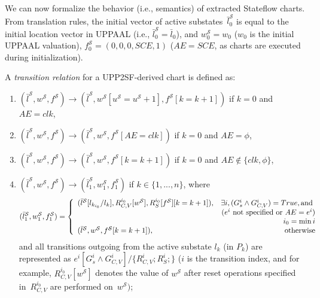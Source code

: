 We can now formalize the behavior (i.e., semantics) of extracted Stateflow charts. From translation rules, the initial vector of active substates~$\bar{l}^\mathcal{S}_0$ is equal to the initial location vector in UPPAAL (i.e., $\bar{l}^\mathcal{S}_0=\bar{l}_0$), and $w^\mathcal{S}_0=w_0$ ($w_0$ is the initial UPPAAL valuation), $f^\mathcal{S}_0=(0,0,0,SCE,1)$ ($AE=SCE$, as charts are executed during initialization). 

\begin{definition}
\label{def:sf_sem}
A \textit{transition relation} for a UPP2SF-derived chart is defined as:

\begin{enumerate}
\item $(\bar{l}^\mathcal{S},w^\mathcal{S},f^\mathcal{S})\rightarrow (\bar{l}^\mathcal{S},w^\mathcal{S}[u^\mathcal{S}=u^\mathcal{S}+1],f^\mathcal{S}[k=k+1])$ if $k=0$ and $AE=clk$,

\item  $(\bar{l}^\mathcal{S},w^\mathcal{S},f^\mathcal{S})\rightarrow (\bar{l}^\mathcal{S},w^\mathcal{S},f^\mathcal{S}[AE=clk])$ if $k=0$ and $AE=\phi$,

\item $(\bar{l}^\mathcal{S},w^\mathcal{S},f^\mathcal{S})\rightarrow (\bar{l}^\mathcal{S},w^\mathcal{S},f^\mathcal{S}[k=k+1])$ if $k=0$ and $AE\notin\{clk,\phi\}$,

\item $(\bar{l}^\mathcal{S},w^\mathcal{S},f^\mathcal{S})\rightarrow (\bar{l}^\mathcal{S}_1,w^\mathcal{S}_1,f^\mathcal{S}_1)$ if $k\in\{1,...,n\}$, where
\begin{equation*}
(\bar{l}^\mathcal{S}_1, w^\mathcal{S}_1,f^\mathcal{S}_1)= \left\{
\begin{array}{lr} 
(\bar{l}^\mathcal{S}[l_{k_{i_0}}/l_k], R_{C,V}^{i_0}[w^\mathcal{S}],R_S^{i_0}[f^\mathcal{S}][k=k+1]), & \exists i, (G_s^i\wedge G_{C,V}^i)=True, \hbox{and }\\
& (e^i\hbox{ not specified or } AE=e^i)\\
& i_0=\min i\\
(\bar{l}^\mathcal{S}, w^\mathcal{S},f^\mathcal{S}[k=k+1]), & \hbox{otherwise}
\end{array}
\right.
\end{equation*}
and all transitions outgoing from the active substate $l_k$ (in $P_k$) are represented as 
$e^i[G_s^i\wedge G_{C,V}^i]/\{R_{C,V}^i; R_S^i;\}$ ($i$ is the transition index, and for example, $R_{C,V}^{i_0}[w^\mathcal{S}]$ denotes the value of $w^\mathcal{S}$ after reset operations specified in~$R_{C,V}^{i_0}$ are performed on~$w^\mathcal{S})$;


\end{enumerate}
\end{definition}
